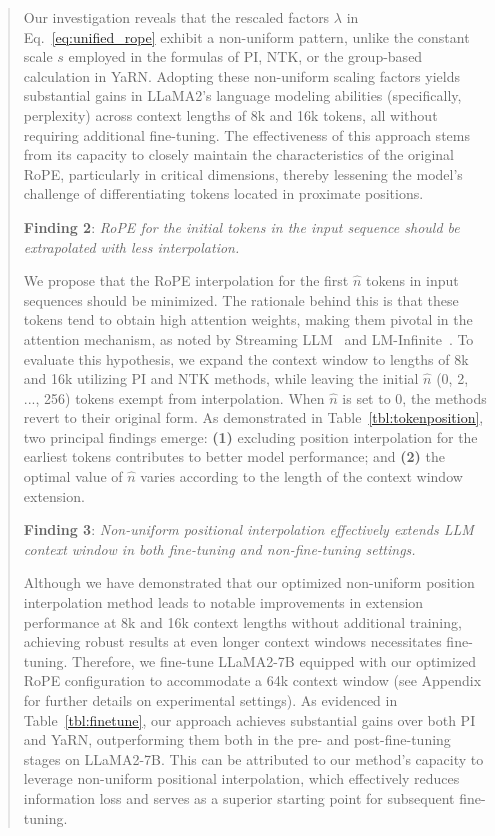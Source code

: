 \begin{abstract}
Our investigation reveals that the rescaled factors $\lambda$ in Eq.~\ref{eq:unified_rope} exhibit a non-uniform pattern, unlike the constant scale $s$ employed in the formulas of PI, NTK, or the group-based calculation in YaRN. Adopting these non-uniform scaling factors yields substantial gains in LLaMA2's language modeling abilities (specifically, perplexity) across context lengths of 8k and 16k tokens, all without requiring additional fine-tuning. The effectiveness of this approach stems from its capacity to closely maintain the characteristics of the original RoPE, particularly in critical dimensions, thereby lessening the model’s challenge of differentiating tokens located in proximate positions.

\textbf{Finding 2}: \textit{RoPE for the initial tokens in the input sequence should be extrapolated with less interpolation.} 

We propose that the RoPE interpolation for the first $\hat{n}$ tokens in input sequences should be minimized. The rationale behind this is that these tokens tend to obtain high attention weights, making them pivotal in the attention mechanism, as noted by Streaming LLM~\cite{streamingllm} and LM-Infinite~\cite{han2023lminfinite}. To evaluate this hypothesis, we expand the context window to lengths of 8k and 16k utilizing PI and NTK methods, while leaving the initial $\hat n$ (0, 2, ..., 256) tokens exempt from interpolation. When $\hat n$ is set to 0, the methods revert to their original form. As demonstrated in Table~\ref{tbl:tokenposition}, two principal findings emerge: \textbf{(1)} excluding position interpolation for the earliest tokens contributes to better model performance; and \textbf{(2)} the optimal value of $\hat n$ varies according to the length of the context window extension.

\textbf{Finding 3}: \textit{Non-uniform positional interpolation effectively extends LLM context window in both fine-tuning and non-fine-tuning settings.} 

Although we have demonstrated that our optimized non-uniform position interpolation method leads to notable improvements in extension performance at 8k and 16k context lengths without additional training, achieving robust results at even longer context windows necessitates fine-tuning. Therefore, we fine-tune LLaMA2-7B equipped with our optimized RoPE configuration to accommodate a 64k context window (see Appendix for further details on experimental settings). As evidenced in Table~\ref{tbl:finetune}, our approach achieves substantial gains over both PI and YaRN, outperforming them both in the pre- and post-fine-tuning stages on LLaMA2-7B. This can be attributed to our method’s capacity to leverage non-uniform positional interpolation, which effectively reduces information loss and serves as a superior starting point for subsequent fine-tuning.


\end{abstract}
